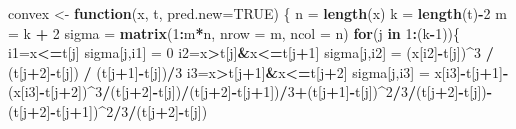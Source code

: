 \documentclass[11pt,]{article}
\newenvironment{Shaded}{\begin{snugshade}}{\end{snugshade}}
\newcommand{\KeywordTok}[1]{\textcolor[rgb]{0.13,0.29,0.53}{\textbf{#1}}}
\newcommand{\DataTypeTok}[1]{\textcolor[rgb]{0.13,0.29,0.53}{#1}}
\newcommand{\DecValTok}[1]{\textcolor[rgb]{0.00,0.00,0.81}{#1}}
\newcommand{\StringTok}[1]{\textcolor[rgb]{0.31,0.60,0.02}{#1}}
\newcommand{\OtherTok}[1]{\textcolor[rgb]{0.56,0.35,0.01}{#1}}
\newcommand{\ControlFlowTok}[1]{\textcolor[rgb]{0.13,0.29,0.53}{\textbf{#1}}}
\newcommand{\OperatorTok}[1]{\textcolor[rgb]{0.81,0.36,0.00}{\textbf{#1}}}
\newcommand{\NormalTok}[1]{#1}
\begin{document}
\begin{Shaded}
\begin{Highlighting}[]
\NormalTok{convex <-}\StringTok{ }\ControlFlowTok{function}\NormalTok{(x, t, }\DataTypeTok{pred.new=}\OtherTok{TRUE}\NormalTok{) \{}
\NormalTok{  n =}\StringTok{ }\KeywordTok{length}\NormalTok{(x)}
\NormalTok{  k =}\StringTok{ }\KeywordTok{length}\NormalTok{(t)}\OperatorTok{-}\DecValTok{2}
\NormalTok{  m =}\StringTok{ }\NormalTok{k }\OperatorTok{+}\StringTok{ }\DecValTok{2}
\NormalTok{  sigma =}\StringTok{ }\KeywordTok{matrix}\NormalTok{(}\DecValTok{1}\OperatorTok{:}\NormalTok{m}\OperatorTok{*}\NormalTok{n, }\DataTypeTok{nrow =}\NormalTok{ m, }\DataTypeTok{ncol =}\NormalTok{ n)}
  \ControlFlowTok{for}\NormalTok{(j }\ControlFlowTok{in} \DecValTok{1}\OperatorTok{:}\NormalTok{(k}\OperatorTok{-}\DecValTok{1}\NormalTok{))\{}
\NormalTok{    i1=x}\OperatorTok{<=}\NormalTok{t[j]}
\NormalTok{    sigma[j,i1] =}\StringTok{ }\DecValTok{0}
\NormalTok{    i2=x}\OperatorTok{>}\NormalTok{t[j]}\OperatorTok{&}\NormalTok{x}\OperatorTok{<=}\NormalTok{t[j}\OperatorTok{+}\DecValTok{1}\NormalTok{]}
\NormalTok{    sigma[j,i2] =}\StringTok{ }\NormalTok{(x[i2]}\OperatorTok{-}\NormalTok{t[j])}\OperatorTok{^}\DecValTok{3} \OperatorTok{/}\StringTok{ }\NormalTok{(t[j}\OperatorTok{+}\DecValTok{2}\NormalTok{]}\OperatorTok{-}\NormalTok{t[j]) }\OperatorTok{/}\StringTok{ }\NormalTok{(t[j}\OperatorTok{+}\DecValTok{1}\NormalTok{]}\OperatorTok{-}\NormalTok{t[j])}\OperatorTok{/}\DecValTok{3}
\NormalTok{    i3=x}\OperatorTok{>}\NormalTok{t[j}\OperatorTok{+}\DecValTok{1}\NormalTok{]}\OperatorTok{&}\NormalTok{x}\OperatorTok{<=}\NormalTok{t[j}\OperatorTok{+}\DecValTok{2}\NormalTok{]}
\NormalTok{    sigma[j,i3] =}\StringTok{ }\NormalTok{x[i3]}\OperatorTok{-}\NormalTok{t[j}\OperatorTok{+}\DecValTok{1}\NormalTok{]}\OperatorTok{-}\NormalTok{(x[i3]}\OperatorTok{-}\NormalTok{t[j}\OperatorTok{+}\DecValTok{2}\NormalTok{])}\OperatorTok{^}\DecValTok{3}\OperatorTok{/}\NormalTok{(t[j}\OperatorTok{+}\DecValTok{2}\NormalTok{]}\OperatorTok{-}\NormalTok{t[j])}\OperatorTok{/}\NormalTok{(t[j}\OperatorTok{+}\DecValTok{2}\NormalTok{]}\OperatorTok{-}\NormalTok{t[j}\OperatorTok{+}\DecValTok{1}\NormalTok{])}\OperatorTok{/}\DecValTok{3}\OperatorTok{+}\NormalTok{(t[j}\OperatorTok{+}\DecValTok{1}\NormalTok{]}\OperatorTok{-}\NormalTok{t[j])}\OperatorTok{^}\DecValTok{2}\OperatorTok{/}\DecValTok{3}\OperatorTok{/}\NormalTok{(t[j}\OperatorTok{+}\DecValTok{2}\NormalTok{]}\OperatorTok{-}\NormalTok{t[j])}\OperatorTok{-}\NormalTok{(t[j}\OperatorTok{+}\DecValTok{2}\NormalTok{]}\OperatorTok{-}\NormalTok{t[j}\OperatorTok{+}\DecValTok{1}\NormalTok{])}\OperatorTok{^}\DecValTok{2}\OperatorTok{/}\DecValTok{3}\OperatorTok{/}\NormalTok{(t[j}\OperatorTok{+}\DecValTok{2}\NormalTok{]}\OperatorTok{-}\NormalTok{t[j])}

\end{Highlighting}
\end{Shaded}
\end{document}

